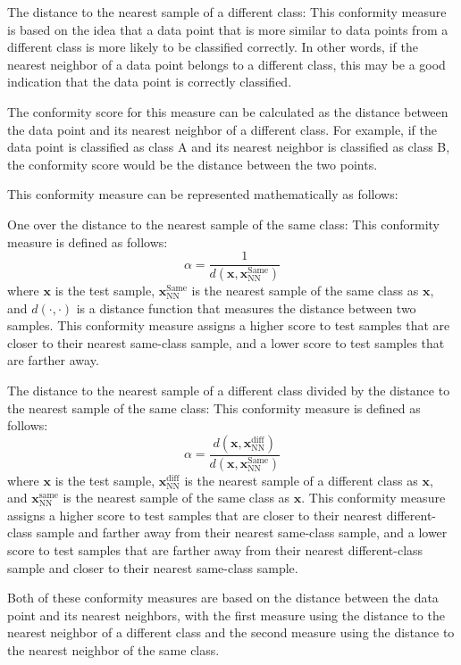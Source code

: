 The distance to the nearest sample of a different class: This conformity measure is based on the idea that a data point that is more similar to data points from a different class is more likely to be classified correctly. In other words, if the nearest neighbor of a data point belongs to a different class, this may be a good indication that the data point is correctly classified.

The conformity score for this measure can be calculated as the distance between the data point and its nearest neighbor of a different class. For example, if the data point is classified as class A and its nearest neighbor is classified as class B, the conformity score would be the distance between the two points.

This conformity measure can be represented mathematically as follows:



One over the distance to the nearest sample of the same class:
This conformity measure is defined as follows:
$$ \alpha = \frac{1}{d(\mathbf{x}, \mathbf{x}_\text{NN}^\text{Same})} $$
where $\mathbf{x}$ is the test sample, $\mathbf{x}_\text{NN}^\text{Same}$ is the nearest sample of the same class as $\mathbf{x}$, and $d(\cdot, \cdot)$ is a distance function that measures the distance between two samples. This conformity measure assigns a higher score to test samples that are closer to their nearest same-class sample, and a lower score to test samples that are farther away.

The distance to the nearest sample of a different class divided by the distance to the nearest sample of the same class:
This conformity measure is defined as follows:
$$ \alpha = \frac{d(\mathbf{x}, \mathbf{x}_\text{NN}^\text{diff})}{d(\mathbf{x}, \mathbf{x}_\text{NN}^\text{Same})} $$
where $\mathbf{x}$ is the test sample, $\mathbf{x}_\text{NN}^\text{diff}$ is the nearest sample of a different class as $\mathbf{x}$, and $\mathbf{x}_\text{NN}^\text{same}$ is the nearest sample of the same class as $\mathbf{x}$. This conformity measure assigns a higher score to test samples that are closer to their nearest different-class sample and farther away from their nearest same-class sample, and a lower score to test samples that are farther away from their nearest different-class sample and closer to their nearest same-class sample.








Both of these conformity measures are based on the distance between the data point and its nearest neighbors, with the first measure using the distance to the nearest neighbor of a different class and the second measure using the distance to the nearest neighbor of the same class.


